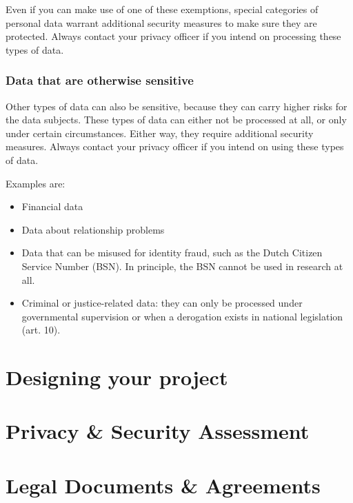 \documentclass[
]{book}
\providecommand{\tightlist}{%
  \setlength{\itemsep}{0pt}\setlength{\parskip}{0pt}}
\begin{document}
Even if you can make use of one of these exemptions, special categories of
personal data warrant additional security measures to make sure they are
protected. Always contact your
privacy officer
if you intend on processing these types of data.

\hypertarget{data-that-are-otherwise-sensitive}{%
\subsection{Data that are otherwise sensitive}\label{data-that-are-otherwise-sensitive}}

Other types of data can also be sensitive, because they can carry higher risks
for the data subjects. These types of data can either not be processed at all,
or only under certain circumstances. Either way, they require additional
security measures. Always contact your
privacy officer
if you intend on using these types of data.

Examples are:

\begin{itemize}
\tightlist
\item
  Financial data
\item
  Data about relationship problems
\item
  Data that can be misused for identity fraud, such as the Dutch Citizen
  Service Number (BSN). In principle, the BSN cannot be used in research at all.
\item
  Criminal or justice-related data: they can only be processed under
  governmental supervision or when a derogation exists in national legislation
  (art. 10).
\end{itemize}

\hypertarget{privacy-by-design}{%
\chapter{Designing your project}\label{privacy-by-design}}

\hypertarget{risk-assessment}{%
\chapter{Privacy \& Security Assessment}\label{risk-assessment}}

\hypertarget{legal-documents}{%
\chapter*{Legal Documents \& Agreements}\label{legal-documents}}
\end{document}
